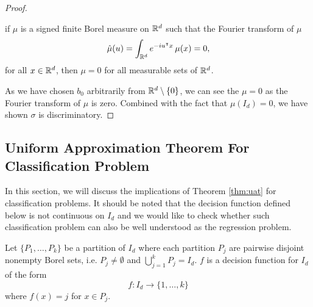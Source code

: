 \begin{proof}
    \begin{lemma}
        if $\mu$ is a signed finite Borel measure on $\mathbb{R}^d$ such that the Fourier
        transform of $\mu$
        \begin{equation}
            \hat{\mu}(u) = \int_{\mathbb{R}^d} e^{-iu{}^{\intercal} x} \,\mu(x) = 0,  
        \end{equation}
        for all $x\in\mathbb{R}^d$, then $\mu = 0$ for all measurable sets of $\mathbb{R}^d$.
    \end{lemma}

    As we have chosen $b_0$ arbitrarily from $\mathbb{R}^d \setminus \{0\}$, we can see
    the $\mu = 0$ as the Fourier transform of $\mu$ is zero. Combined with the
    fact that $\mu(I_d) = 0$, we have shown $\sigma$ is discriminatory.

\end{proof}





\subsection{Uniform Approximation Theorem For Classification Problem}

In this section, we will discuss the implications of Theorem \ref{thm:uat} for
classification problems. It should be noted that the decision function defined
below is not continuous on $I_d$ and we would like to check whether such
classification problem can also be well understood as the regression problem.

\begin{definition}
    Let $\{P_1, \dots, P_k\}$ be a partition of $I_d$ where each partition $P_j$
    are pairwise disjoint nonempty Borel sets, i.e. $P_j \not= \emptyset$ and
    $\bigcup_{j=1}^k P_j = I_d$. $f$ is a decision function for $I_d$ of the
    form
    \begin{equation}
        f: I_d \to \{1, \dots, k\}
    \end{equation}
    where $f(x) = j$ for $x \in P_j$. 
\end{definition}

